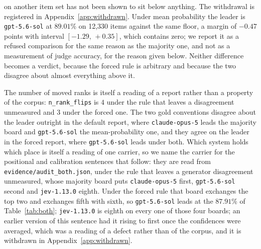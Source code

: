 \documentclass{article}
\newcommand{\ids}[1]{\texttt{\small #1}} %
\begin{document}
on another item set has not been shown to sit below anything. The withdrawal is registered in Appendix~\ref{app:withdrawn}. Under mean probability the leader is \ids{gpt-5.6-sol} at $89.01\%$ on 12,330 items against the same floor, a margin of $-0.47$ points with interval $[-1.29,\,+0.35]$, which contains zero; we report it as a refused comparison for the same reason as the majority one, and not as a measurement of judge accuracy, for the reason given below. Neither difference becomes a verdict, because the forced rule is arbitrary and because the two disagree about almost everything above it.

The number of moved ranks is itself a reading of a report rather than a property of the corpus: \texttt{n\_rank\_flips} is $4$ under the rule that leaves a disagreement unmeasured and $3$ under the forced one. The two gold conventions disagree about the leader outright in the default report, where \ids{claude-opus-5} leads the majority board and \ids{gpt-5.6-sol} the mean-probability one, and they agree on the leader in the forced report, where \ids{gpt-5.6-sol} leads under both. Which system holds which place is itself a reading of one carrier, so we name the carrier for the positional and calibration sentences that follow: they are read from \ids{evidence/audit\_both.json}, under the rule that leaves a generator disagreement unmeasured, whose majority board puts \ids{claude-opus-5} first, \ids{gpt-5.6-sol} second and \ids{jev-1.13.0} eighth. Under the forced rule that board exchanges the top two and exchanges fifth with sixth, so \ids{gpt-5.6-sol} leads at the $87.91\%$ of Table~\ref{tab:both}; \ids{jev-1.13.0} is eighth on every one of those four boards; an earlier version of this sentence had it rising to first once the confidences were averaged, which was a reading of a defect rather than of the corpus, and it is withdrawn in Appendix~\ref{app:withdrawn}.
\end{document}
